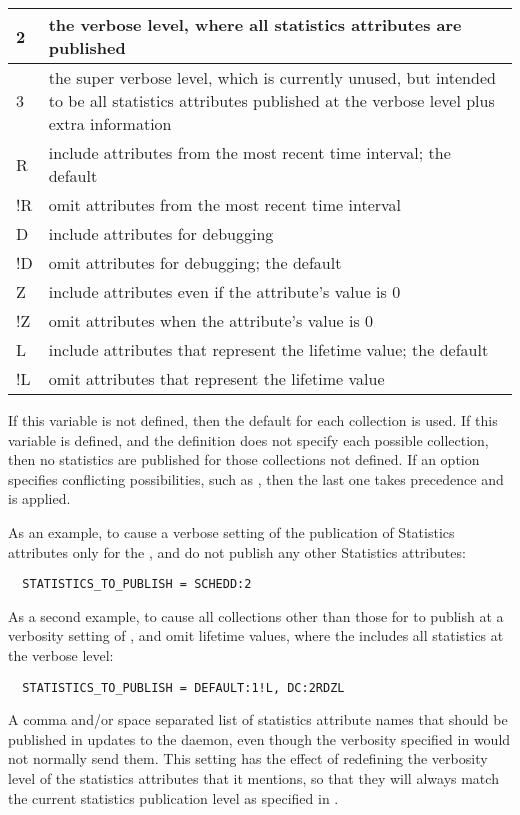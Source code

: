 \begin{description}
\begin{center}
\begin{table}[hbt]
\begin{tabular}{|p{2cm}p{12cm}|}
2 & the verbose level, where all statistics attributes
  are published \\ \hline
3 & the super verbose level, which is currently unused,
  but intended to be all statistics attributes published at the verbose
  level plus extra information \\ \hline
R & include attributes from the most recent time interval;
the default \\ \hline
!R & omit attributes from the most recent time interval \\ \hline
D & include attributes for debugging \\ \hline
!D & omit attributes for debugging; the default \\ \hline
Z & include attributes even if the attribute's value is 0 \\ \hline
!Z & omit attributes when the attribute's value is 0 \\ \hline
L & include attributes that represent the lifetime value;
the default \\ \hline
!L & omit attributes that represent the lifetime value \\ \hline
\end{tabular}
\end{table}
\end{center}

  If this variable is not defined, then the default for each collection 
  is used.
  If this variable is defined, and the definition does not specify each
  possible collection, then no statistics are published for those collections
  not defined.
  If an option specifies conflicting possibilities, such as ,
  then the last one takes precedence and is applied. 

  As an example, to cause a verbose setting of the publication of Statistics
  attributes only for the , and do not publish any other
  Statistics attributes:
\begin{verbatim}
  STATISTICS_TO_PUBLISH = SCHEDD:2
\end{verbatim}
  As a second example, to cause all collections other than 
  those for  to publish at a verbosity setting of ,
  and omit lifetime values, where the  includes all
  statistics at the verbose level:
\begin{verbatim}
  STATISTICS_TO_PUBLISH = DEFAULT:1!L, DC:2RDZL
\end{verbatim}
  
\label{param:StatisticsToPublishList}
\item[\Macro{STATISTICS\_TO\_PUBLISH\_LIST}]
  A comma and/or space separated list of statistics attribute names
  that should be published in updates to the  daemon,
  even though
  the verbosity specified in  would
  not normally send them.  This setting has the effect of redefining
  the verbosity level of the statistics attributes that it mentions,
  so that
  they will always match the current statistics publication level as
  specified in .


\end{description}

